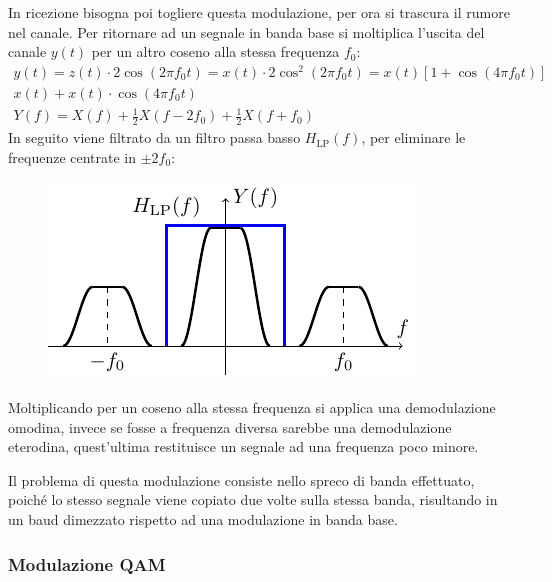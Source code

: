 \documentclass{article}
\numberwithin{equation}{subsection}
\begin{document}
In ricezione bisogna poi togliere questa modulazione, per ora si trascura il rumore nel canale. Per ritornare ad un segnale in banda base si moltiplica l'uscita del 
canale $y(t)$ per un altro coseno alla stessa frequenza $f_0$:
\begin{gather*}
    y(t)=z(t)\cdot2\cos(2\pi f_0t)=x(t)\cdot2\cos^2(2\pi f_0t)=x(t)\left[1+\cos(4\pi f_0t)\right]\\
    x(t)+x(t)\cdot\cos(4\pi f_0t)\\
    Y(f)=X(f)+\displaystyle\frac{1}{2}X(f-2f_0)+\frac{1}{2}X(f+f_0)
\end{gather*}
In seguito viene filtrato da un filtro passa basso $H_{\mathrm{LP}}(f)$, per eliminare le frequenze centrate in $\pm2f_0$:
\begin{figure}[H]%
    \centering
    \includegraphics{modulazione-portante.pdf}
\end{figure}
Moltiplicando per un coseno alla stessa frequenza si applica una demodulazione omodina, invece se fosse a frequenza diversa sarebbe una demodulazione eterodina, quest'ultima 
restituisce un segnale ad una frequenza poco minore. 

Il problema di questa modulazione consiste nello spreco di banda effettuato, poiché lo stesso segnale viene copiato due volte sulla stessa banda, risultando in un baud 
dimezzato rispetto ad una modulazione in banda base. 

\subsubsection{Modulazione QAM}
\end{document}
